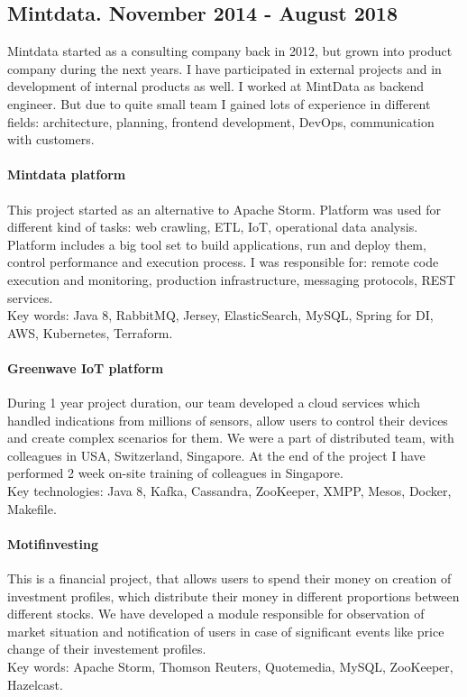 \documentclass{article}
\begin{document}
\subsection*{Mintdata. November 2014 - August 2018}
Mintdata started as a consulting company back in 2012, but grown into product company during the next years. I have participated in external projects and in development of internal products as well. I worked at MintData as backend engineer. But due to quite small team I gained lots of experience in different fields: architecture, planning, frontend development, DevOps, communication with customers.

\paragraph{Mintdata platform} This project started as an alternative to Apache Storm. Platform was used for different kind of tasks: web crawling, ETL, IoT, operational data analysis. Platform includes a big tool set to build applications, run and deploy them, control performance and execution process. I was responsible for: remote code execution and monitoring, production infrastructure, messaging protocols, REST services.\\
Key words: Java 8, RabbitMQ, Jersey, ElasticSearch, MySQL, Spring for DI, AWS, Kubernetes, Terraform.

\paragraph{Greenwave IoT platform} During 1 year project duration, our team developed a cloud services which handled indications from millions of sensors, allow users to control their devices and create complex scenarios for them. We were a part of distributed team, with colleagues in USA, Switzerland, Singapore. At the end of the project I have performed 2 week on-site training of colleagues in Singapore.\\
Key technologies: Java 8, Kafka, Cassandra, ZooKeeper, XMPP, Mesos, Docker, Makefile.

\paragraph{Motifinvesting} This is a financial project, that allows users to spend their money on creation of investment profiles, which distribute their money in different proportions between different stocks. We have developed a module responsible for observation of market situation and notification of users in case of significant events like price change of their investement profiles.\\
Key words: Apache Storm, Thomson Reuters, Quotemedia, MySQL, ZooKeeper, Hazelcast.
\end{document}
